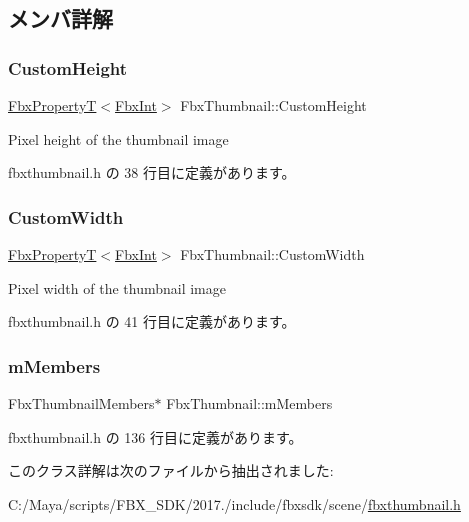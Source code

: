 \subsection{メンバ詳解}
\mbox{\label{class_fbx_thumbnail_a42a590e1eb6e45788e3afb50d81824ec}} 
\subsubsection{\texorpdfstring{Custom\+Height}{CustomHeight}}
{\footnotesize\ttfamily \hyperlink{class_fbx_property_t}{Fbx\+PropertyT}$<$\hyperlink{fbxtypes_8h_a088fa96de3b0b3ea69f0f6afef525dfb}{Fbx\+Int}$>$ Fbx\+Thumbnail\+::\+Custom\+Height}



Pixel height of the thumbnail image 



 fbxthumbnail.\+h の 38 行目に定義があります。

\mbox{\label{class_fbx_thumbnail_a791822f52e133326b3a366ab6cda9757}} 
\subsubsection{\texorpdfstring{Custom\+Width}{CustomWidth}}
{\footnotesize\ttfamily \hyperlink{class_fbx_property_t}{Fbx\+PropertyT}$<$\hyperlink{fbxtypes_8h_a088fa96de3b0b3ea69f0f6afef525dfb}{Fbx\+Int}$>$ Fbx\+Thumbnail\+::\+Custom\+Width}



Pixel width of the thumbnail image 



 fbxthumbnail.\+h の 41 行目に定義があります。

\mbox{\label{class_fbx_thumbnail_afde37b4e171f395489d254b61f42a6cd}} 
\subsubsection{\texorpdfstring{m\+Members}{mMembers}}
{\footnotesize\ttfamily Fbx\+Thumbnail\+Members$\ast$ Fbx\+Thumbnail\+::m\+Members\hspace{0.3cm}{\ttfamily [protected]}}



 fbxthumbnail.\+h の 136 行目に定義があります。



このクラス詳解は次のファイルから抽出されました\+:\begin{DoxyCompactItemize}
\item 
C\+:/\+Maya/scripts/\+F\+B\+X\+\_\+\+S\+D\+K/2017./include/fbxsdk/scene/\hyperlink{fbxthumbnail_8h}{fbxthumbnail.\+h}\end{DoxyCompactItemize}
